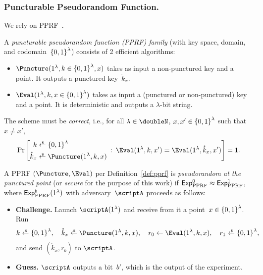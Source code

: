 \subsubsection{Puncturable Pseudorandom Function.}
We rely on PPRF~\cite{AC:BonWat13,CCS:KPTZ13,PKC:BoyGolIva14,STOC:SahWat14}.

\begin{definition}\label{def:pprf}
A \emph{puncturable pseudorandom function (PPRF) family} (with key space, domain, and codomain~${\{0,1\}}^\lambda$) consists of 2 efficient algorithms:
\begin{itemize}
\item ${\Puncture(1^\lambda,k\in\bit^\lambda,x)}$
takes as input a non-punctured key and a point.
It out\-puts a punctured key~$\mathring{k}_x$.
\item ${\Eval(1^\lambda,k,x\in\bit^\lambda)}$
takes as input a (punctured or non-punctured) key and a point.
It is deterministic and outputs a $\lambda$-bit string.
\end{itemize}
The scheme must be \emph{correct}, i.e., for all
${\lambda\in\doubleN}$,
${x,x'\in{\{0,1\}}^\lambda}$ such that ${x\neq x'}$,
\begin{align*}
\Pr\left[
\begin{aligned}
k&{}\draws\bit^\lambda\\
\mathring{k}_x&{}\draws\Puncture(1^\lambda,k,x)
\end{aligned}
\::\:
\Eval(1^\lambda,k,x')
=
\Eval(1^\lambda,\mathring{k}_x,x')
\right]=1.
\end{align*}
\end{definition}

\begin{definition}\label{def:pprf-security}
A PPRF $(\Puncture,\Eval)$ per Definition~\ref{def:pprf} is \emph{pseudorandom at the punctured point} (or \emph{secure} for the purpose of this work)
if ${\ExpPPRF{0}\approx\ExpPPRF{1}}$,
where $\ExpPPRF{b}(1^\lambda)$ with adversary~$\scriptA$ proceeds as follows:
\begin{itemize}\upshape
\item\textbf{Challenge.}
Launch $\scriptA(1^\lambda)$ and receive from it a point~${x\in{\{0,1\}}^\lambda}$.
Run
\begin{align*}
\WideNarrow{}{\hspace*{-1.2em}}
k\draws\bit^\lambda,\quad
\mathring{k}_x\draws\Puncture(1^\lambda,k,x),\quad
r_0\gets\Eval(1^\lambda,k,x),\quad
r_1\draws\bit^\lambda,
\end{align*}
and send $(\mathring{k}_x,r_b)$ to $\scriptA$.
\item\textbf{Guess.}
$\scriptA$ outputs a bit~$b'$, which is the output of the experiment.
\end{itemize}
\end{definition}
